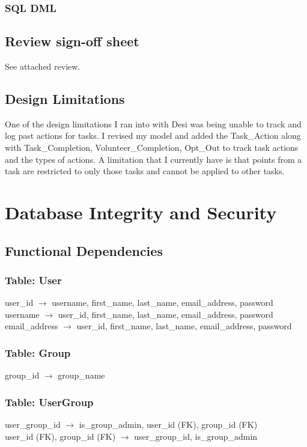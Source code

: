 \documentclass[11pt, a4paper]{report}
\begin{document}
\subsection{SQL DML}



\section{Review sign-off sheet}
See attached review.

\section{Design Limitations}
One of the design limitations I ran into with Desi was being unable to track and log past actions for tasks. I revised my model and added the Task\_Action along with Task\_Completion, Volunteer\_Completion, Opt\_Out to track task actions and the types of actions. A limitation that I currently have is that points from a task are restricted to only those tasks and cannot be applied to other tasks.

\chapter{Database Integrity and Security}
\section{Functional Dependencies}
\subsection{Table: User}
user\_id $\rightarrow$ username, first\_name, last\_name, email\_address, password \\
username $\rightarrow$ user\_id, first\_name, last\_name, email\_address, password \\
email\_address $\rightarrow$ user\_id, first\_name, last\_name, email\_address, password \\

\subsection{Table: Group}
group\_id $\rightarrow$ group\_name

\subsection{Table: UserGroup}
user\_group\_id $\rightarrow$ is\_group\_admin, user\_id (FK), group\_id (FK)\\
user\_id (FK), group\_id (FK) $\rightarrow$ user\_group\_id, is\_group\_admin
\end{document}
